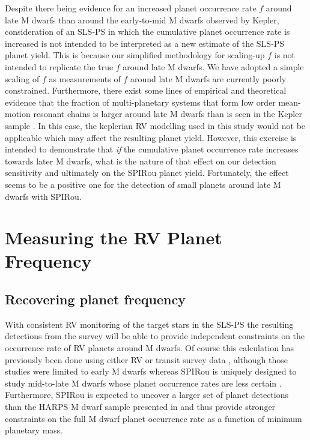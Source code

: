 Despite there being evidence for an increased planet occurrence rate $f$ around late M dwarfs
than around the early-to-mid M dwarfs observed by Kepler, consideration of an SLS-PS
in which the cumulative planet occurrence rate is increased is not intended to be
interpreted as a new estimate of the SLS-PS planet yield. This is because our simplified
methodology for scaling-up $f$ is not intended to replicate the true $f$ around late M
dwarfs. We have adopted a simple scaling of $f$ as measurements
of $f$ around late M dwarfs are currently poorly constrained. Furthermore, there exist
some lines of empirical and theoretical evidence \citep{gillon17, pan17}
that the fraction of multi-planetary systems that
form low order mean-motion resonant chains is larger around late M dwarfs than is seen in the
Kepler sample \citep{lissauer11, fabrycky14}. In this case, the keplerian RV modelling used
in this study would not be applicable which may affect the resulting planet yield.
However, this exercise is intended to demonstrate that \emph{if} the cumulative planet occurrence
rate increases towards later M dwarfs, what is the nature of that effect
on our detection sensitivity and ultimately on the SPIRou planet yield.
Fortunately, the effect seems to be a positive
one for the detection of small planets around late M dwarfs with SPIRou.

\section{Measuring the RV Planet Frequency} \label{BSsect:measurements}
\subsection{Recovering planet frequency} \label{BSsect:occurrence}
With consistent RV monitoring of the target stars in the SLS-PS the resulting detections
from the survey will be able to provide independent constraints on the occurrence rate of
RV planets around M dwarfs.
Of course this calculation has previously been done using either
RV or transit survey data \citep[e.g.][]{bonfils13, dressing15a},
although those studies were limited to early M dwarfs whereas SPIRou is uniquely designed
to study mid-to-late M dwarfs whose planet occurrence rates are less certain \citep{demory16}.
Furthermore,
SPIRou is expected to uncover a larger set of planet detections than the HARPS M dwarf sample
presented in \cite{bonfils13} and thus provide stronger constraints on the full M dwarf planet
occurrence rate as a function of minimum planetary mass. \\

